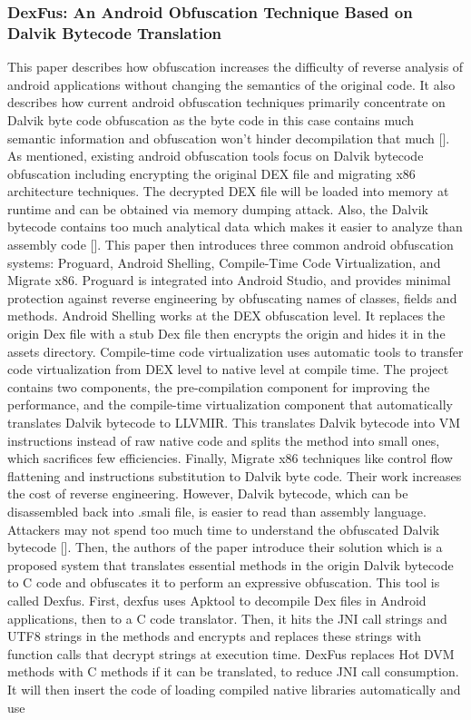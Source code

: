 \documentclass[conference,a4paper]{IEEEtran}
\begin{document}
\subsubsection{DexFus: An Android Obfuscation Technique Based on Dalvik Bytecode Translation}
This paper describes how obfuscation increases the difficulty of reverse analysis of android applications without changing the semantics of the original code. It also describes how current android obfuscation techniques primarily concentrate on Dalvik byte code obfuscation as the byte code in this case contains much semantic information and obfuscation won’t hinder decompilation that much [].
As mentioned, existing android obfuscation tools focus on Dalvik bytecode obfuscation including encrypting the original DEX file and migrating x86 architecture techniques. The decrypted DEX file will be loaded into memory at runtime and can be obtained via memory dumping attack. Also, the Dalvik bytecode contains too much analytical data which makes it easier to analyze than assembly code [].
This paper then introduces three common android obfuscation systems: Proguard, Android Shelling, Compile-Time Code Virtualization, and Migrate x86. Proguard is integrated into Android Studio, and provides minimal protection against reverse engineering by obfuscating names of classes, fields and methods. Android Shelling works at the DEX obfuscation level. It replaces the origin Dex file with a stub Dex file then encrypts the origin and hides it in the assets directory. Compile-time code virtualization uses automatic tools to transfer code virtualization from DEX level to native level at compile time. The project contains two components, the pre-compilation component for improving the performance, and the compile-time virtualization component that automatically translates Dalvik bytecode to LLVMIR. This translates Dalvik bytecode into VM instructions instead of raw native code and splits the method into small ones, which sacrifices few efficiencies. Finally, Migrate x86 techniques like control flow flattening and instructions substitution to Dalvik byte code. Their work increases the cost of reverse engineering. However, Dalvik bytecode, which can be disassembled back into .smali file, is easier to read than assembly language. Attackers may not spend too much time to understand the obfuscated Dalvik bytecode [].
Then, the authors of the paper introduce their solution which is a proposed system that translates essential methods in the origin Dalvik bytecode to C code and obfuscates it to perform an expressive obfuscation. This tool is called Dexfus. First, dexfus uses Apktool to decompile Dex files in Android applications, then to a C code translator. Then, it hits the JNI call strings and UTF8 strings in the methods and encrypts and replaces these strings with function calls that decrypt strings at execution time. DexFus replaces Hot DVM methods with C methods if it can be translated, to reduce JNI call consumption. It will then insert the code of loading compiled native libraries automatically and use
\end{document}
